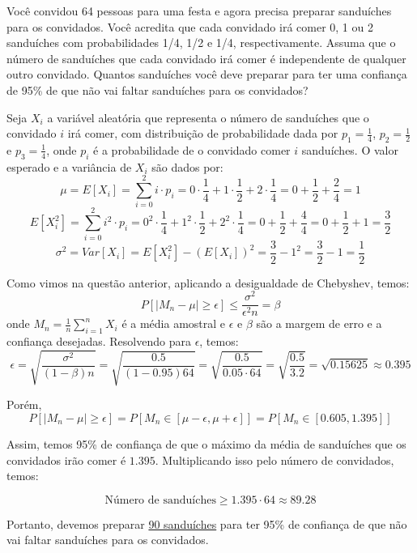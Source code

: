 \documentclass[12 pt]{article}
\begin{document}
Você convidou 64 pessoas para uma festa e agora precisa preparar sanduíches para os convidados. Você acredita que cada convidado irá comer 0, 1 ou 2 sanduíches com probabilidades 1/4, 1/2 e 1/4, respectivamente. Assuma que o número de sanduíches que cada convidado irá comer é independente de qualquer outro convidado. Quantos sanduíches você deve preparar para ter uma confiança de 95\% de que não vai faltar sanduíches para os convidados?
\begin{tcolorbox}[colframe=black, title=Resposta:]
    Seja $X_i$ a variável aleatória que representa o número de sanduíches que o convidado $i$ irá comer, com distribuição de probabilidade dada por $p_1=\frac{1}{4}$, $p_2=\frac{1}{2}$ e $p_3=\frac{1}{4}$, onde $p_i$ é a probabilidade de o convidado comer $i$ sanduíches. O valor esperado e a variância de $X_i$ são dados por:
    $$
    \mu = E[X_i] = \sum_{i=0}^2 i \cdot p_i = 0 \cdot \frac{1}{4} + 1 \cdot \frac{1}{2} + 2 \cdot \frac{1}{4} = 0 + \frac{1}{2} + \frac{2}{4} = 1
    $$
    $$
    E[X_i^2] = \sum_{i=0}^2 i^2 \cdot p_i = 0^2 \cdot \frac{1}{4} + 1^2 \cdot \frac{1}{2} + 2^2 \cdot \frac{1}{4} = 0 + \frac{1}{2} + \frac{4}{4} = 0 + \frac{1}{2} + 1 = \frac{3}{2}
    $$
    $$
    \sigma^2 = Var[X_i] = E[X_i^2] - (E[X_i])^2 = \frac{3}{2} - 1^2 = \frac{3}{2} - 1 = \frac{1}{2}
    $$

    Como vimos na questão anterior, aplicando a desigualdade de Chebyshev, temos:
    $$
    P[|M_n - \mu| \geq \epsilon] \leq \frac{\sigma^2}{\epsilon^2n} = \beta
    $$
    onde $M_n = \frac{1}{n}\sum_{i=1}^n X_i$ é a média amostral e $\epsilon$ e $\beta$ são a margem de erro e a confiança desejadas. Resolvendo para $\epsilon$, temos:
    $$
    \epsilon = \sqrt{\frac{\sigma^2}{(1-\beta)n}} = \sqrt{\frac{0.5}{(1-0.95)64}} = \sqrt{\frac{0.5}{0.05\cdot64}} = \sqrt{\frac{0.5}{3.2}} = \sqrt{0.15625} \approx 0.395
    $$

    Porém, 
    $$ 
    P[|M_n - \mu| \geq \epsilon] = P[M_n \in [\mu - \epsilon, \mu + \epsilon]] = P[M_n \in [0.605, 1.395]]
    $$

    Assim, temos 95\% de confiança de que o máximo da média de sanduíches que os convidados irão comer é $1.395$. Multiplicando isso pelo número de convidados, temos:

    $$
    \text{Número de sanduíches} \geq 1.395 \cdot 64 \approx 89.28
    $$

    Portanto, devemos preparar \underline{90 sanduíches} para ter 95\% de confiança de que não vai faltar sanduíches para os convidados.
\end{tcolorbox}
\end{document}

